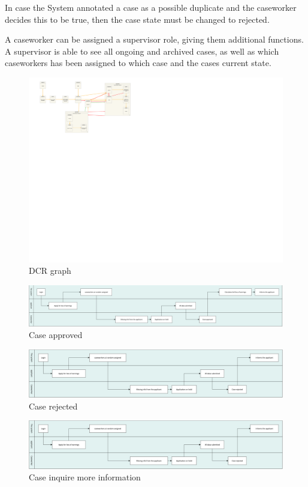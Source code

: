\vspace{2mm}

In case the System annotated a case as a possible duplicate and the caseworker decides this to be true, then the case state must be changed to rejected.

\vspace{2mm}

A caseworker can be assigned a supervisor role, giving them additional functions. A supervisor is able to see all ongoing and archived cases, as well as which caseworkers has been assigned to which case and the cases current state.
\newpage
\begin{figure}[htb!]
	\includegraphics[]{dcrgraph/dcrgraph.svg}
	\caption{DCR graph}
\end{figure}

\newpage
\begin{figure}[htb!]
    \centering
    \includegraphics[width=\textwidth]{img/swim-case-approved.png}
    \caption{Case approved}
\end{figure}

\begin{figure}[htb!]
    \centering
    \includegraphics[width=\textwidth]{img/swim-case-rejected.png}
    \caption{Case rejected}
\end{figure}

\begin{figure}[htb!]
    \centering
    \includegraphics[width=\textwidth]{img/swim-case-rejected.png}
    \caption{Case inquire more information}
\end{figure}
